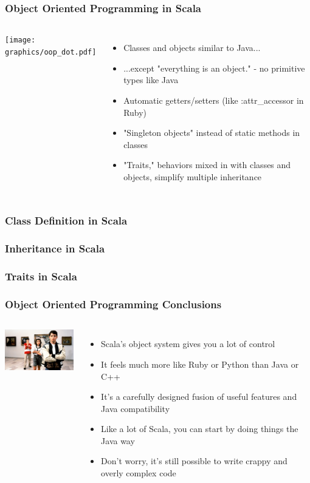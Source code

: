 \begin{frame} 
\frametitle{Object Oriented Programming in Scala}
\begin{columns}[c]
  \column{1.0in}
    \texttt{[image: graphics/oop\_dot.pdf]} 
  \column{2.0in}
    \begin{itemize}
      \item<1-> Classes and objects similar to Java...
      \item<2-> ...except "everything is an object." - no primitive types like Java
      \item<3-> Automatic getters/setters (like :attr\_accessor in Ruby)
      \item<4-> "Singleton objects" instead of static methods in classes
      \item<5-> "Traits," behaviors mixed in with classes and objects, simplify multiple inheritance
    \end{itemize}
\end{columns}
\end{frame} 

\begin{frame}
\frametitle{Class Definition in Scala}
\tt\small{

}
\end{frame} 

\begin{frame}
\frametitle{Inheritance in Scala}
\tt\tiny{

}
\end{frame} 

\begin{frame}
\frametitle{Traits in Scala}
\tt\tiny{

}
\end{frame} 

\begin{frame} 
\frametitle{Object Oriented Programming Conclusions}
\begin{columns}[c]
  \column{1.0in}
    \includegraphics[width=1.5in]{graphics/ferris.jpg} 
  \column{2.0in}
    \begin{itemize}
      \item<1-> Scala's object system gives you a lot of control
      \item<2-> It feels much more like Ruby or Python than Java or C++
      \item<3-> It's a carefully designed fusion of useful features and Java compatibility
      \item<4-> Like a lot of Scala, you can start by doing things the Java way
      \item<5-> Don't worry, it's still possible to write crappy and overly complex code
    \end{itemize}
\end{columns}
\end{frame} 

